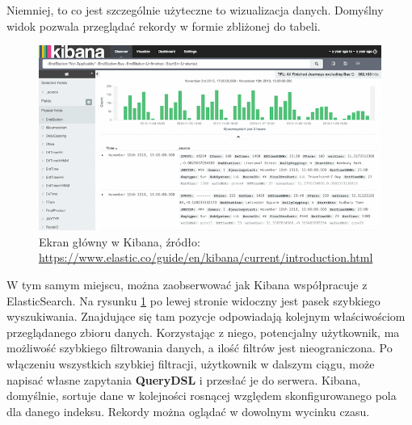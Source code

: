     Niemniej, to co jest szczególnie użyteczne to wizualizacja danych. Domyślny widok pozwala przeglądać 
    rekordy w formie zbliżonej do tabeli. 
    \begin{figure}[h]
        \centering
        \includegraphics[width=1.0\textwidth]{images/kibana_main_view}
        \caption[Ekran główny w Kibana]{
            Ekran główny w Kibana, źródło: \url{https://www.elastic.co/guide/en/kibana/current/introduction.html}
        }
        \label{chapter:application:elkstack:kibana:main_view}
    \end{figure}
    W tym samym miejscu, można zaobserwować jak Kibana współpracuje z ElasticSearch. Na rysunku \ref{chapter:application:elkstack:kibana:main_view} po lewej stronie widoczny jest pasek szybkiego
    wyszukiwania. Znajdujące się tam pozycje odpowiadają kolejnym właściwościom przeglądanego zbioru danych.
    Korzystając z niego, potencjalny użytkownik, ma możliwość szybkiego filtrowania danych, a ilość filtrów jest
    nieograniczona. Po włączeniu wszystkich szybkiej filtracji, użytkownik w dalszym ciągu, może napisać
    własne zapytania \textbf{QueryDSL} i przesłać je do serwera. Kibana, domyślnie, sortuje dane w kolejności
    rosnącej względem skonfigurowanego pola dla danego indeksu. Rekordy można oglądać w dowolnym wycinku czasu.
    
